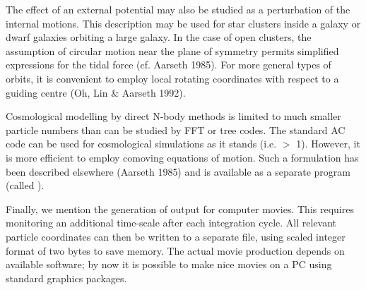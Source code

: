   The effect of an external potential may also be studied as a perturbation
of the internal motions.
This description may be used for star clusters inside a galaxy or dwarf
galaxies orbiting a large galaxy.
In the case of open clusters, the assumption of circular motion near the
plane of \hbox {symmetry} \hbox {permits} simplified expressions for the
tidal force (cf. Aarseth 1985).
For more general types of orbits, it is convenient to employ local rotating
co\-ordinates with respect to a guiding centre (Oh, Lin \& Aarseth 1992).

   Cosmological modelling by direct N-body methods is limited to much smaller
particle numbers than can be studied by FFT or tree codes.
The standard AC code can be used for cosmological simulations as it stands
(i.e.  $>$ 1).
However, it is more efficient to employ comoving equations of motion.
Such a formulation has been described elsewhere (Aarseth 1985) and
is available as a separate program (called ).

   Finally, we mention the generation of output for computer movies.
This requires monitoring an additional time-scale after each integration cycle.
All relevant particle coordinates can then be written to a separate file,
using scaled integer format of two bytes to save memory.
The actual movie production depends on available software; by now it is
possible to make nice movies on a PC using standard graphics packages.

